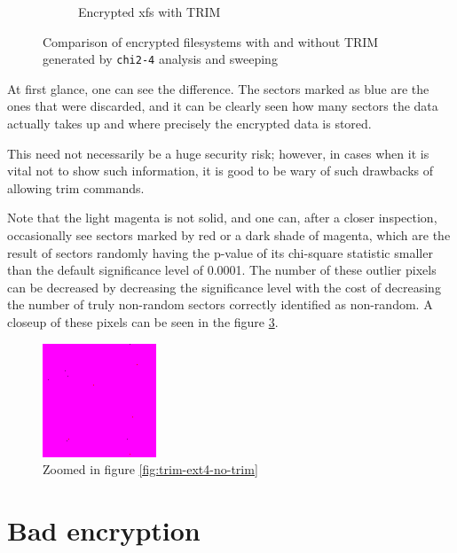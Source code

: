 \documentclass[
  digital, %
  oneside, %
  lof,     %
  lot,     %
]{fithesis4}
\begin{document}
\begin{figure}
\begin{subfigure}[b]{0.45\textwidth}
    \caption{Encrypted xfs with TRIM}
    \label{fig:trim-xfs-trim}
  \end{subfigure}
  \caption{Comparison of encrypted filesystems with and without TRIM generated by \texttt{chi2-4} analysis and sweeping}
  \label{fig:trim-comparison}
\end{figure}

At first glance, one can see the difference.
The sectors marked as blue are the ones that were discarded, and it can be clearly seen how many sectors the data actually takes up and where precisely the encrypted data is stored.

This need not necessarily be a huge security risk; however, in cases when it is vital not to show such information, it is good to be wary of such drawbacks of allowing trim commands.

Note that the light magenta is not solid, and one can, after a closer inspection, occasionally see sectors marked by red or a dark shade of magenta, which are the result of sectors randomly having the p-value of its chi-square statistic smaller than the default significance level of 0.0001.
The number of these outlier pixels can be decreased by decreasing the significance level with the cost of decreasing the number of truly non-random sectors correctly identified as non-random.
A closeup of these pixels can be seen in the figure \ref{fig:trim-zoomed}.

\begin{figure}
    \centering
    \includegraphics[width=.5\textwidth,interpolate=false]{figures/test-ext4-no-trim-chi2-4-sweeping-zoomed.png}
    \caption{Zoomed in figure \ref{fig:trim-ext4-no-trim}}
    \label{fig:trim-zoomed}
\end{figure}

\section{Bad encryption}
\end{document}
